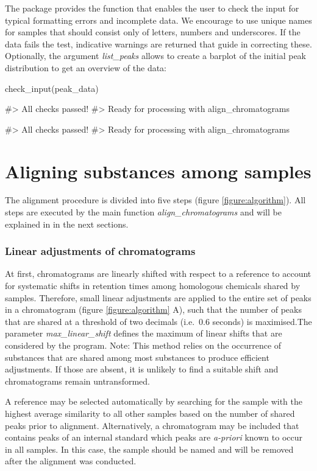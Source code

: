 The package provides the function  that enables
the user to check the input for typical formatting errors and incomplete
data. We encourage to use unique names for samples that should consist
only of letters, numbers and underscores. If the data fails the test,
indicative warnings are returned that guide in correcting these.
Optionally, the argument \textit{list{\_}peaks} allows to create a
barplot of the initial peak distribution to get an overview of the data:

\begin{Schunk}
\begin{Sinput}
check_input(peak_data)
\end{Sinput}
\begin{Soutput}
#> All checks passed!
#> Ready for processing with align_chromatograms
\end{Soutput}
\begin{Sinput}
#> All checks passed!
#> Ready for processing with align_chromatograms
\end{Sinput}
\end{Schunk}

\section{Aligning substances among samples}

The alignment procedure is divided into five steps (figure
\ref{figure:algorithm}). All steps are executed by the main function
\textit{align{\_}chromatograms} and will be explained in in the next
sections. \subsubsection{Linear adjustments of chromatograms} At first,
chromatograms are linearly shifted with respect to a reference to
account for systematic shifts in retention times among homologous
chemicals shared by samples. Therefore, small linear adjustments are
applied to the entire set of peaks in a chromatogram (figure
\ref{figure:algorithm} A), such that the number of peaks that are shared
at a threshold of two decimals (i.e.~0.6 seconds) is maximised.The
parameter \textit{max{\_}linear{\_}shift} defines the maximum of linear
shifts that are considered by the program. \newline
Note: This method relies on the occurrence of substances that are shared
among most substances to produce efficient adjustments. If those are
absent, it is unlikely to find a suitable shift and chromatograms remain
untransformed. \par
A reference may be selected automatically by searching for the sample
with the highest average similarity to all other samples based on the
number of shared peaks prior to alignment. Alternatively, a chromatogram
may be included that contains peaks of an internal standard which peaks
are \textit{a-priori} known to occur in all samples. In this case, the
sample should be named  and will be removed after the
alignment was conducted.

